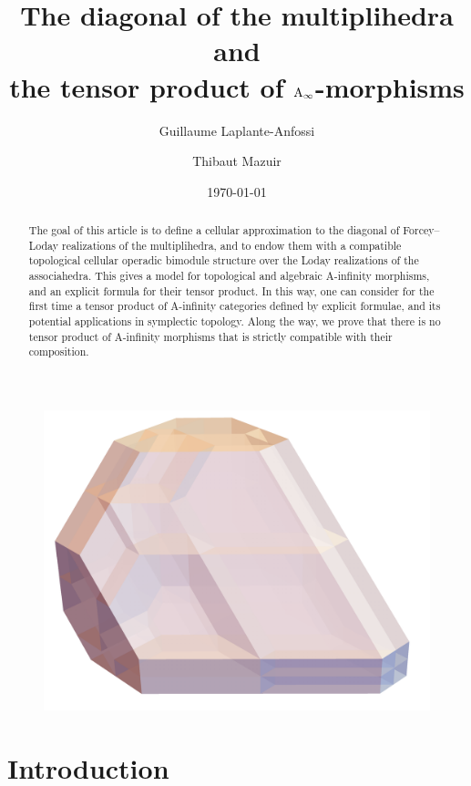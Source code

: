 \documentclass[twoside, 12pt]{amsart}
\title[The diagonal of the multiplihedra]{The diagonal of the multiplihedra and \\ the tensor product of $\mathrm{A}_\infty$-morphisms}
\author{Guillaume Laplante-Anfossi}
\author{Thibaut Mazuir}
\date{\today}
\theoremstyle{remark}
\begin{document}
\begin{abstract}
The goal of this article is to define a cellular approximation to the diagonal of Forcey--Loday realizations of the multiplihedra, and to endow them with a compatible topological cellular operadic bimodule structure over the Loday realizations of the associahedra. 
This gives a model for topological and algebraic A-infinity morphisms, and an explicit formula for their tensor product.
In this way, one can consider for the first time a tensor product of A-infinity categories defined by explicit formulae, and its potential applications in symplectic topology. 
Along the way, we prove that there is no tensor product of A-infinity morphisms that is strictly compatible with their composition. 
\end{abstract}

\maketitle

\begin{figure}[h!]
\centering
\includegraphics[width=0.6\linewidth]{J4.png} 
\label{Fig5:J4}
\end{figure}

\setcounter{tocdepth}{1}
\tableofcontents


\section*{Introduction}



\end{document}
